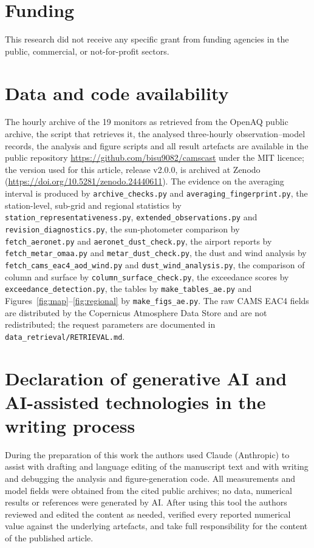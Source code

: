 \documentclass[preprint,review,12pt,authoryear]{elsarticle}
\begin{document}
\section*{Funding}
This research did not receive any specific grant from funding agencies in the public, commercial,
or not-for-profit sectors.

\section*{Data and code availability}
\sloppy
The hourly archive of the 19 monitors as retrieved from the OpenAQ public archive, the script
that retrieves it, the analysed three-hourly observation--model records, the analysis and figure
scripts and all result artefacts are available in the public repository
\url{https://github.com/bisu9082/camscast} under the MIT licence; the version used for this article, release v2.0.0, is archived at Zenodo (\url{https://doi.org/10.5281/zenodo.24440611}). The evidence on the
averaging interval is produced by \texttt{archive\_checks.py} and
\texttt{averaging\_fingerprint.py}, the station-level, sub-grid and regional statistics by
\texttt{station\_representativeness.py}, \texttt{extended\_observations.py} and
\texttt{revision\_diagnostics.py}, the sun-photometer comparison by
\texttt{fetch\_aeronet.py} and \texttt{aeronet\_dust\_check.py}, the airport reports by
\texttt{fetch\_metar\_omaa.py} and \texttt{metar\_dust\_check.py}, the dust and wind analysis by
\texttt{fetch\_cams\_eac4\_aod\_wind.py} and \texttt{dust\_wind\_analysis.py}, the comparison of column and surface by \texttt{column\_surface\_check.py}, the exceedance
scores by \texttt{exceedance\_detection.py}, the tables by \texttt{make\_tables\_ae.py} and
Figures~\ref{fig:map}--\ref{fig:regional} by \texttt{make\_figs\_ae.py}. The raw CAMS EAC4 fields
are distributed by the Copernicus Atmosphere Data Store and are not redistributed; the request
parameters are documented in \texttt{data\_retrieval/RETRIEVAL.md}.

\section*{Declaration of generative AI and AI-assisted technologies in the writing process}
During the preparation of this work the authors used Claude (Anthropic) to assist with drafting
and language editing of the manuscript text and with writing and debugging the analysis and
figure-generation code. All measurements and model fields were obtained from the cited public
archives; no data, numerical results or references were generated by AI. After using this tool
the authors reviewed and edited the content as needed, verified every reported numerical value
against the underlying artefacts, and take full responsibility for the content of the published
article.
\end{document}
